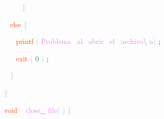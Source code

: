 \documentclass[8, usernames, dvipsnames]{beamer}
\begin{document}
\begin{frame}
\textcolor{White}{\   }
\textcolor{White}{\   }
\textcolor{White}{\   }
\textcolor{SkyBlue}{\} }

 \textcolor{White}{\   }
\textcolor{OrangeRed}{else}
\textcolor{SkyBlue}{\{ }

 \textcolor{White}{\   }
\textcolor{White}{\   }
\textcolor{OrangeRed}{printf}
\textcolor{SkyBlue}{(}
\textcolor{Violet}{Problema}\textcolor{White}{\ }
\textcolor{Violet}{al}\textcolor{White}{\ }
\textcolor{Violet}{abrir}\textcolor{White}{\ }
\textcolor{Violet}{el}\textcolor{White}{\ }
\textcolor{Violet}{archivo}\textcolor{Gray}{\textbackslash }
\textcolor{Violet}{n}\textcolor{SkyBlue}{)}
\textcolor{Sepia}{;}

 \textcolor{White}{\   }
\textcolor{White}{\   }
\textcolor{OrangeRed}{exit}
\textcolor{SkyBlue}{(}
\textcolor{SeaGreen}{0}
\textcolor{SkyBlue}{)}
\textcolor{Sepia}{;}

 \textcolor{White}{\   }
\textcolor{SkyBlue}{\} }

 
 \textcolor{SkyBlue}{\} }

 
 
 \textcolor{OrangeRed}{void}
\textcolor{White}{\ }
\textcolor{Violet}{close}\textcolor{Sepia}{\_}
\textcolor{Violet}{file}\textcolor{SkyBlue}{(}
\textcolor{SkyBlue}{)}
\textcolor{SkyBlue}{\{ }

 \end{frame}
\end{document}
